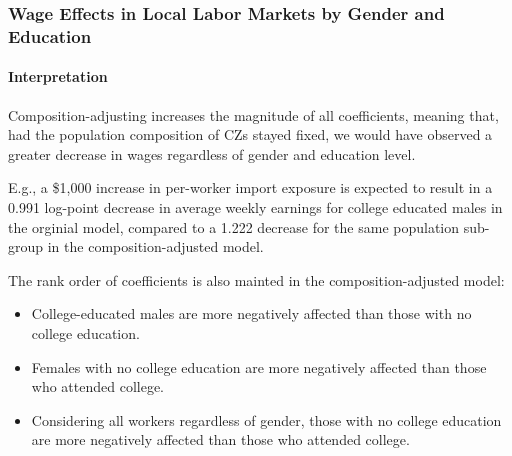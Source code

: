 \begin{frame}
    \frametitle{Wage Effects in Local Labor Markets by Gender and Education}
    \framesubtitle{Interpretation}

    Composition-adjusting increases the magnitude of all coefficients, meaning that, had the population composition of CZs stayed fixed, we would have observed a greater decrease in wages regardless of gender and education level.
        
    E.g., a \$1,000 increase in per-worker import exposure is expected to result in a 0.991 log-point decrease in average weekly earnings for college educated males in the orginial model, compared to a 1.222 decrease for the same population sub-group in the composition-adjusted model.
    
    The rank order of coefficients is also mainted in the composition-adjusted model: 
    \begin{itemize}
        \item College-educated males are more negatively affected than those with no college education.
        
        \item Females with no college education are more negatively affected than those who attended college.
    
        \item Considering all workers regardless of gender, those with no college education are more negatively affected than those who attended college.
        \end{itemize}
        
\end{frame}